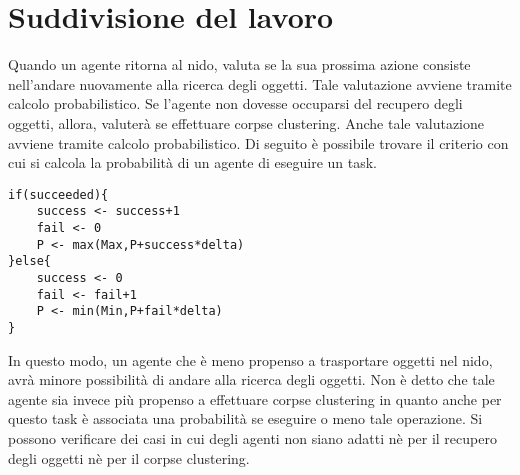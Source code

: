 \documentclass[12pt,a4paper,openright,twoside]{report}
\begin{document}
\section{Suddivisione del lavoro}

Quando un agente ritorna al nido, valuta se la sua prossima azione consiste nell'andare nuovamente alla ricerca degli oggetti. Tale valutazione avviene tramite calcolo probabilistico. Se l'agente non dovesse occuparsi del recupero degli oggetti, allora, valuterà se effettuare corpse clustering. Anche tale valutazione avviene tramite calcolo probabilistico. Di seguito è possibile trovare il criterio con cui si calcola la probabilità di un agente di eseguire un task.\\


\begin{verbatim}
if(succeeded){
    success <- success+1
    fail <- 0
    P <- max(Max,P+success*delta)
}else{
    success <- 0
    fail <- fail+1
    P <- min(Min,P+fail*delta)
}
\end{verbatim}

In questo modo, un agente che è meno propenso a trasportare oggetti nel nido, avrà minore possibilità di andare alla ricerca degli oggetti. Non è detto che tale agente sia invece più propenso a effettuare corpse clustering in quanto anche per questo task è associata una probabilità se eseguire o meno tale operazione. Si possono verificare dei casi in cui degli agenti non siano adatti nè per il recupero degli oggetti nè per il corpse clustering.
\end{document}
